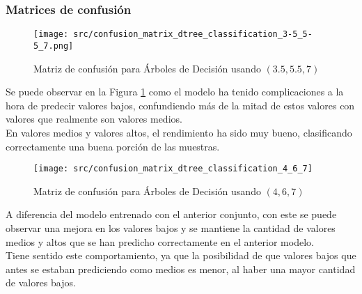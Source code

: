 \subsubsection*{Matrices de confusión}
\begin{figure}[H]
	\centering
	\texttt{[image: src/confusion\_matrix\_dtree\_classification\_3-5\_5-5\_7.png]}
	\caption{Matriz de confusión para Árboles de Decisión usando $(3.5,5.5,7)$}
	\label{fig:confusion_matrix_dtree1}
\end{figure}
Se puede observar en la Figura \ref{fig:confusion_matrix_dtree1} como el modelo ha tenido complicaciones a la hora de predecir valores bajos, confundiendo más de la mitad de estos valores con valores que realmente son valores medios.\\
En valores medios y valores altos, el rendimiento ha sido muy bueno, clasificando correctamente una buena porción de las muestras.
\clearpage
\begin{figure}[H]
	\centering
	\texttt{[image: src/confusion\_matrix\_dtree\_classification\_4\_6\_7]}
	\caption{Matriz de confusión para Árboles de Decisión usando $(4,6,7)$}
	\label{fig:confusion_matrix_dtree2}
\end{figure}
A diferencia del modelo entrenado con el anterior conjunto, con este se puede observar una mejora en los valores bajos y se mantiene la cantidad de valores medios y altos que se han predicho correctamente en el anterior modelo.\\
Tiene sentido este comportamiento, ya que la posibilidad de que valores bajos que antes se estaban prediciendo como medios es menor, al haber una mayor cantidad de valores bajos.\\
\clearpage
